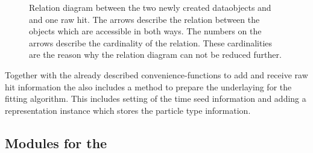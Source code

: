 \begin{figure}
  \centering
  \caption[Relation diagram between \RecoTrack, \Hit and raw hits.]{Relation diagram between the two newly created dataobjects \RecoTrack and \Hit and one raw hit. The arrows describe the relation between the objects which are accessible in both ways. The numbers on the arrows describe the cardinality of the relation. These cardinalities are the reason why the relation diagram can not be reduced further.}
  \label{fig-reco-hit-relation}
\end{figure}

Together with the already described convenience-functions to add and receive raw hit information the \RecoTrack also includes a method to prepare the underlaying \Track for the fitting algorithm. This includes setting of the time seed information and adding a representation instance which stores the particle type information.

\subsection{Modules for the \RecoTrack}

